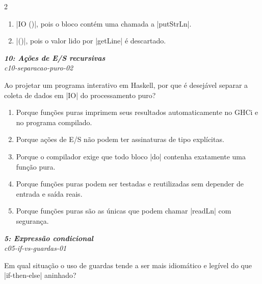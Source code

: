 \documentclass[a4paper,10pt,brazil]{article}
\begin{document}
\begin{multicols}{2}
\begin{enumerate}
  \item \haskellinline|IO ()|, pois o bloco contém uma chamada a \haskellinline|putStrLn|.

  \item \haskellinline|()|, pois o valor lido por \haskellinline|getLine| é descartado.


\end{enumerate}

\begin{flushright}
  \footnotesize
  \textit{\textbf{10: Ações de E/S recursivas}}\\
  \textit{c10-separacao-puro-02}\\

\end{flushright}
Ao projetar um programa interativo em Haskell, por que é desejável separar a coleta de dados em \haskellinline|IO| do processamento puro?

\begin{enumerate}
  \item Porque funções puras imprimem seus resultados automaticamente no GHCi e no programa compilado.

  \item Porque ações de E/S não podem ter assinaturas de tipo explícitas.

  \item Porque o compilador exige que todo bloco \haskellinline|do| contenha exatamente uma função pura.

  \item Porque funções puras podem ser testadas e reutilizadas sem depender de entrada e saída reais.

  \item Porque funções puras são as únicas que podem chamar \haskellinline|readLn| com segurança.


\end{enumerate}

\begin{flushright}
  \footnotesize
  \textit{\textbf{5: Expressão condicional}}\\
  \textit{c05-if-vs-guardas-01}\\

\end{flushright}
Em qual situação o uso de guardas tende a ser mais idiomático e legível do que \haskellinline|if-then-else| aninhado?


\end{multicols}
\end{document}
